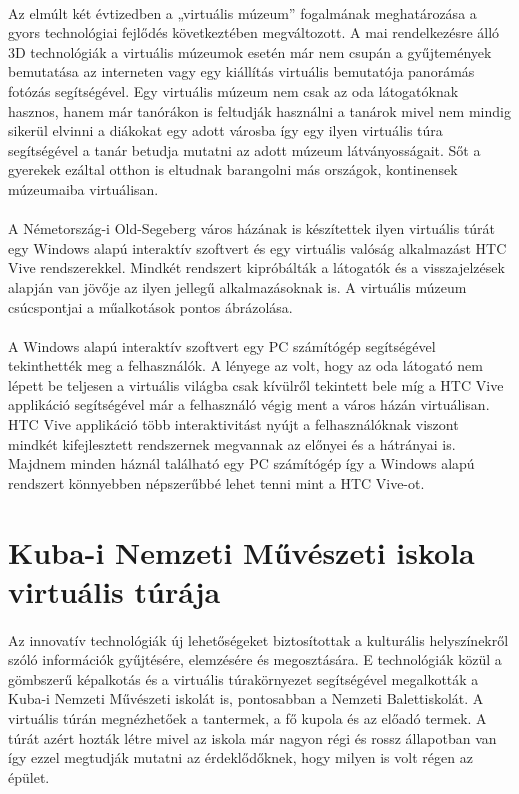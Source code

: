 \paragraph{}
Az elmúlt két évtizedben a „virtuális múzeum” fogalmának meghatározása a gyors technológiai fejlődés következtében megváltozott. A mai rendelkezésre álló 3D technológiák a virtuális múzeumok esetén már nem csupán a gyűjtemények bemutatása az interneten vagy egy kiállítás virtuális bemutatója panorámás fotózás segítségével. Egy virtuális múzeum nem csak az oda látogatóknak hasznos, hanem már tanórákon is feltudják használni a tanárok mivel nem mindig sikerül elvinni a diákokat egy adott városba így egy ilyen virtuális túra segítségével a tanár betudja mutatni az adott múzeum látványosságait. Sőt a gyerekek ezáltal otthon is eltudnak barangolni más országok, kontinensek múzeumaiba virtuálisan.
\paragraph{}
A Németország-i Old-Segeberg város házának is készítettek ilyen virtuális túrát egy Windows alapú interaktív szoftvert és egy virtuális valóság alkalmazást HTC Vive rendszerekkel. Mindkét rendszert kipróbálták a látogatók és a visszajelzések alapján van jövője az ilyen jellegű alkalmazásoknak is. A virtuális múzeum csúcspontjai a műalkotások pontos ábrázolása. 
\paragraph{}
A Windows alapú interaktív szoftvert egy PC számítógép segítségével tekinthették meg a felhasználók. A lényege az volt, hogy az oda látogató nem lépett be teljesen a virtuális világba csak kívülről tekintett bele míg a HTC Vive applikáció segítségével már a felhasználó végig ment a város házán virtuálisan. HTC Vive applikáció több interaktivitást nyújt a felhasználóknak viszont mindkét kifejlesztett rendszernek megvannak az előnyei és a hátrányai is. Majdnem minden háznál található egy PC számítógép így a Windows alapú rendszert könnyebben népszerűbbé lehet tenni mint a HTC Vive-ot. \cite{kersten2017development}

\section{Kuba-i Nemzeti Művészeti iskola virtuális túrája}
\paragraph{}
Az innovatív technológiák új lehetőségeket biztosítottak a kulturális helyszínekről szóló információk gyűjtésére, elemzésére és megosztására. E technológiák közül a gömbszerű képalkotás és a virtuális túrakörnyezet segítségével megalkották a Kuba-i Nemzeti Művészeti iskolát is, pontosabban a Nemzeti Balettiskolát. A virtuális túrán megnézhetőek a tantermek, a fő kupola és az előadó termek. A túrát azért hozták létre mivel az iskola már nagyon régi és rossz állapotban van így ezzel megtudják mutatni az érdeklődőknek, hogy milyen is volt régen az épület.
